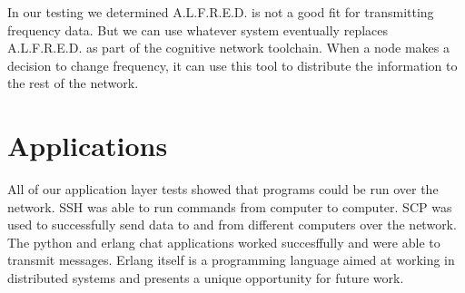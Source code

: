 In our testing we determined A.L.F.R.E.D. is not a good fit for transmitting frequency data. But we can use whatever system eventually replaces A.L.F.R.E.D. as part of the cognitive network toolchain. When a node makes a decision to change frequency, it can use this tool to distribute the information to the rest of the network. 

\section{Applications}

All of our application layer tests showed that programs could be run over the network. SSH was able to run commands from computer to computer. SCP was used to successfully send data to and from different computers over the network. The python and erlang chat applications worked succesffully and were able to transmit messages. Erlang itself is a programming language aimed at working in distributed systems and presents a unique opportunity for future work.  
